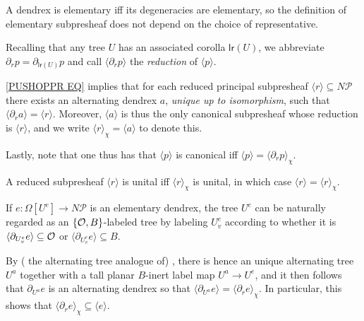 \documentclass[a4paper,10pt
,draft
]{article}%
\renewcommand{\1}{\eta}%
\begin{document}
\begin{remark}
A dendrex is elementary iff its degeneracies are elementary,
so the definition of elementary subpresheaf does not depend on the choice of representative.
\end{remark}


\begin{notation}
Recalling that any tree $U$
has an associated corolla $\mathsf{lr}(U)$, 
we abbreviate
$\partial_r p = \partial_{\mathsf{lr}(U)}p$
and call
$\langle \partial_r p \rangle$
the \emph{reduction} of  
$\langle p \rangle$.
\end{notation}




\begin{remark}\label{PUSHOPPRRST REM}
\eqref{PUSHOPPR EQ} 
implies
that for each reduced principal subpresheaf
$\langle r \rangle \subseteq N \mathcal{P}$
there exists an alternating dendrex $a$, 
\emph{unique up to isomorphism}, 
such that
$\langle \partial_r a \rangle = \langle r \rangle$.
%
Moreover, $\langle a \rangle$ is thus the only canonical subpresheaf whose reduction is 
$\langle r \rangle$,
and we write
$\langle r \rangle_{\chi} = \langle a \rangle$
to denote this.

Lastly, note that one thus has that 
$\langle p \rangle$ is canonical iff
$\langle p \rangle = \langle \partial_r p \rangle_{\chi}$.
\end{remark}


\begin{remark}\label{UNITALCASE REM}
A reduced subpresheaf $\langle r \rangle$
is unital iff 
$\langle r \rangle_{\chi}$ is unital, in which case
$\langle r \rangle = \langle r \rangle_{\chi}$.
\end{remark}



\begin{remark}\label{ELEMLABEL REM}
If $e \colon \Omega[U^e] \to N \mathcal{P}$
is an elementary dendrex,
the tree $U^e$ can be naturally regarded as an
$\{\mathcal{O},B\}$-labeled tree by labeling $U^e_v$ according to whether
it is $\langle \partial_{U^e_v} e\rangle \subseteq \mathcal{O} $ or
$\langle \partial_{U^e_v} e\rangle \subseteq B$.

By ({\color{blue} the alternating tree analogue of})
\cite[Prop. 5.49]{BP_geo}, there is hence an unique alternating tree $U^a$ together with a tall planar $B$-inert label map $U^a \to U^e$,
and it then follows that
$\partial_{U^a} e$ is an alternating dendrex so that
$\langle \partial_{U^a} e \rangle = \langle \partial_r e \rangle_{\chi}$.
%
In particular, this shows that
$\langle \partial_r e \rangle_{\chi} \subseteq 
\langle e \rangle$.
\end{remark}
\end{document}
